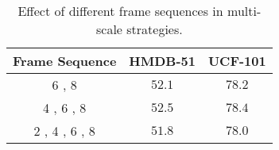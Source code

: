\begin{table}[!h]
    \centering
    \begin{tabular}{ccc}
        \toprule[1pt]
         \textbf{Frame Sequence}      & \textbf{HMDB-51}      & \textbf{UCF-101} \\ 
        \hline
        6 , 8          & $52.1$              & $78.2$   \\
        4 , 6 , 8      & $\mathbf{52.5}$              & $\mathbf{78.4}$   \\
        2 , 4 , 6 , 8  & $51.8$              & $78.0$   \\
        \bottomrule[1pt]
    \end{tabular}
    \caption{Effect of different frame sequences in multi-scale strategies.}
    \label{tab::MSS}
\end{table}